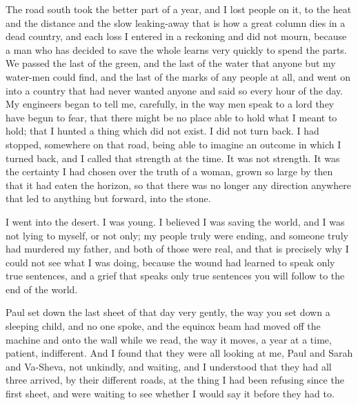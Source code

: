 The road south took the better part of a year, and I lost people on it, to the heat and the distance and the slow leaking-away that is how a great column dies in a dead country, and each loss I entered in a reckoning and did not mourn, because a man who has decided to save the whole learns very quickly to spend the parts. We passed the last of the green, and the last of the water that anyone but my water-men could find, and the last of the marks of any people at all, and went on into a country that had never wanted anyone and said so every hour of the day. My engineers began to tell me, carefully, in the way men speak to a lord they have begun to fear, that there might be no place able to hold what I meant to hold; that I hunted a thing which did not exist. I did not turn back. I had stopped, somewhere on that road, being able to imagine an outcome in which I turned back, and I called that strength at the time. It was not strength. It was the certainty I had chosen over the truth of a woman, grown so large by then that it had eaten the horizon, so that there was no longer any direction anywhere that led to anything but forward, into the stone.\par

I went into the desert. I was young. I believed I was saving the world, and I was not lying to myself, or not only; my people truly were ending, and someone truly had murdered my father, and both of those were real, and that is precisely why I could not see what I was doing, because the wound had learned to speak only true sentences, and a grief that speaks only true sentences you will follow to the end of the world.\par

\ornament

Paul set down the last sheet of that day very gently, the way you set down a sleeping child, and no one spoke, and the equinox beam had moved off the machine and onto the wall while we read, the way it moves, a year at a time, patient, indifferent. And I found that they were all looking at me, Paul and Sarah and Va-Sheva, not unkindly, and waiting, and I understood that they had all three arrived, by their different roads, at the thing I had been refusing since the first sheet, and were waiting to see whether I would say it before they had to.\par

